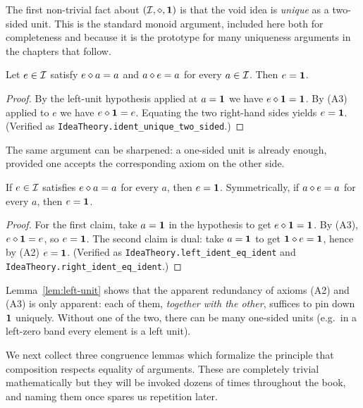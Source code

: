 The first non-trivial fact about $(\mathcal{I},\mathbin{\diamond},\mathbf{1})$ is that the void idea is
\emph{unique} as a two-sided unit.  This is the standard monoid argument,
included here both for completeness and because it is the prototype for
many uniqueness arguments in the chapters that follow.

\begin{lemma}\label{lem:unit-unique-twosided}
Let $e \in \mathcal{I}$ satisfy $e \mathbin{\diamond} a = a$ and $a \mathbin{\diamond} e = a$ for
every $a \in \mathcal{I}$.  Then $e = \mathbf{1}$.
\end{lemma}

\begin{proof}
By the left-unit hypothesis applied at $a = \mathbf{1}$ we have
$e \mathbin{\diamond} \mathbf{1} = \mathbf{1}$.  By (A3) applied to $e$ we have
$e \mathbin{\diamond} \mathbf{1} = e$.  Equating the two right-hand sides yields
$e = \mathbf{1}$.  (Verified as
\texttt{IdeaTheory.ident\_unique\_two\_sided}.)
\end{proof}

The same argument can be sharpened: a one-sided unit is already enough,
provided one accepts the corresponding axiom on the other side.

\begin{lemma}\label{lem:left-unit}
If $e \in \mathcal{I}$ satisfies $e \mathbin{\diamond} a = a$ for every $a$, then
$e = \mathbf{1}$.  Symmetrically, if $a \mathbin{\diamond} e = a$ for every $a$, then
$e = \mathbf{1}$.
\end{lemma}

\begin{proof}
For the first claim, take $a = \mathbf{1}$ in the hypothesis to get
$e \mathbin{\diamond} \mathbf{1} = \mathbf{1}$.  By (A3), $e \mathbin{\diamond} \mathbf{1} = e$, so $e = \mathbf{1}$.
The second claim is dual: take $a = \mathbf{1}$ to get $\mathbf{1} \mathbin{\diamond} e = \mathbf{1}$,
hence by (A2) $e = \mathbf{1}$.  (Verified as
\texttt{IdeaTheory.left\_ident\_eq\_ident} and
\texttt{IdeaTheory.right\_ident\_eq\_ident}.)
\end{proof}

\begin{remark}
Lemma~\ref{lem:left-unit} shows that the apparent redundancy of axioms
(A2) and (A3) is only apparent: each of them, \emph{together with the
other}, suffices to pin down $\mathbf{1}$ uniquely.  Without one of the two,
there can be many one-sided units (e.g.\ in a left-zero band every element
is a left unit).
\end{remark}

We next collect three congruence lemmas which formalize the principle
that composition respects equality of arguments.  These are completely
trivial mathematically but they will be invoked dozens of times throughout
the book, and naming them once spares us repetition later.

